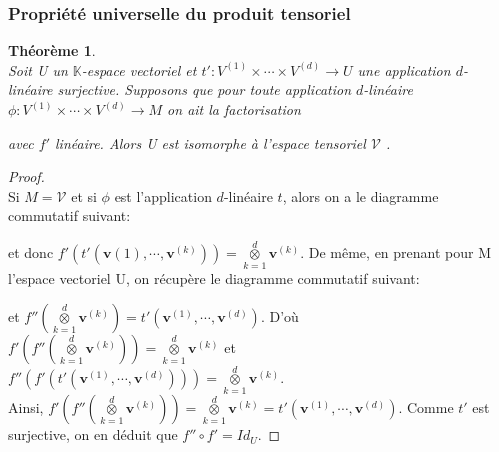 \documentclass[11pt,a4paper,oneside]{book}
\newtheorem{theo}{Théorème}[chapter]
\newtheorem{proof}{Démonstration}
\def\K{\mathbb K}
\def\V{\mathcal V}
\def\ktensor{\overset{d}{\underset{k=1}{\otimes}}}
\def\v{\mathbf v}
\begin{document}
\subsubsection{Propriété universelle du produit tensoriel}
\begin{theo}
\emph{\\}
Soit U un $ \K $-espace vectoriel et $ t':V^{(1)}\times\cdots\times V^{(d)}\longrightarrow U $ une application $ d $-linéaire surjective. Supposons que pour toute application $ d $-linéaire $ \phi:V^{(1)}\times\cdots\times V^{(d)}\longrightarrow M $ on ait la factorisation 
	\begin{center}
\end{center} avec $ f' $ linéaire. Alors U est isomorphe à l'espace tensoriel $\V$ \cite[p.126]{Michel2013}.
\end{theo}
\begin{proof}
\emph{\\}
Si $ M=\V$ et si $ \phi $ est l'application $ d $-linéaire $ t $, alors on a le diagramme commutatif suivant:
	\begin{center}
\end{center}
et donc $ f'(t'(\v{(1)},\cdots,\v^{(k)}))=\ktensor\v^{(k)} $. De même, en prenant pour M l'espace vectoriel U, on récupère le diagramme commutatif suivant:
	\begin{center}
\end{center}
et $ f''\left(\ktensor \v^{(k)}\right)=t'(\v^{(1)},\cdots,\v^{(d)}) $. D'où $ f'\left(f''\left(\ktensor \v^{(k)}\right)\right)=\ktensor \v^{(k)} $ et\\ $ f''(f'(t'(\v^{(1)},\cdots,\v^{(d)})))=\ktensor \v^{(k)}.$\\ Ainsi, $ f'\left(f''\left(\ktensor \v^{(k)}\right)\right)=\ktensor \v^{(k)}=t'(\v^{(1)},\cdots,\v^{(d)}) $. Comme $ t' $ est surjective, on en déduit que $ f''\circ f'=Id_{U}.$
\end{proof}
\end{document}
